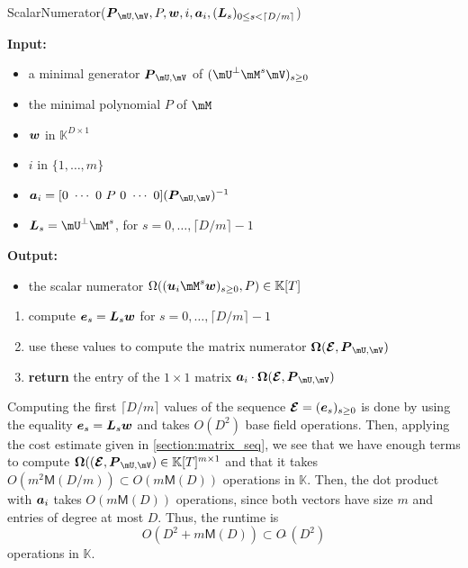 \documentclass[12pt]{article}
\newcommand{\mat}[1]{\bm{\MakeUppercase{#1}}} %
\newcommand{\row}[1]{\bm{\MakeLowercase{#1}}} %
\newcommand{\col}[1]{\bm{\MakeLowercase{#1}}} %
\newcommand{\softO}[1]{O{\tilde{~}}(#1)} %
\newcommand{\minpoly}{P}
\def\M {\ensuremath{\mathsf{M}}}
\def\K{\mathbb{K}}
\def\K {\ensuremath{\mathbb{K}}}
\begin{document}
\begin{algorithm}[H]
	\caption{{\sf ScalarNumerator}($\mat{P}_{\mU,\mV}, \minpoly, \row{w}, i, \row{a}_i,(\mat{L}_s)_{0 \le s < \lceil D/m\rceil}$)}
	{\bf Input:} \vspace{-0.5em}
	\begin{itemize}
		\item a minimal generator $\mat{P}_{\mU,\mV}$ of $(\mU^\perp \mM^s \mV)_{s \ge 0}$
    \item the minimal polynomial $P$ of $\mM$
    \item $\row{w}$ in $\K^{D \times 1}$
    \item $i$ in $\{1,\dots,m\}$
    \item $\row{a}_i =  [0~\cdots~0~\minpoly~0~\cdots~0]  (\mat{P}_{\mU,\mV})^{-1} $
		\item $\mat{L}_s = \mU^\perp \mM^s$, for $s=0,\dots,\lceil D/m\rceil-1$
	\end{itemize}
	{\bf Output:}  \vspace{-0.5em}
        \begin{itemize}
        \item         the scalar numerator $\Omega((\row{u}_i \mM^s \col{w})_{s \ge 0}, \minpoly) \in \K[T]$
        \end{itemize}
        \begin{enumerate}[{\bf 1.}]
        \item compute $\col{E}_s = \mat{L}_s \col{w}$ for $s=0,\dots,\lceil D/m\rceil-1$
        \item use these values to compute the matrix numerator $ \mat{\Omega}(\mat{\mathcal{E}}, \mat{P}_{\mU,\mV})$ 
        \item {\bf return} the entry of the $1 \times 1$ matrix $\row{a}_i\cdot  \mat{\Omega}(\mat{\mathcal{E}}, \mat{P}_{\mU,\mV})$ 
        \end{enumerate}
	\label{algo:scalar_numerator}
\end{algorithm}

Computing the first $\lceil D/m \rceil$ values of the sequence
$\mat{\mathcal{E}}=(\col{e}_s)_{s \ge 0}$ is done by using the
equality $\col{E}_s = \mat{L}_s \col{w}$ and takes $O(D^2)$ base field
operations. Then, applying the cost estimate given in
\cref{section:matrix_seq}, we see that we have enough terms to compute
$\mat{\Omega}( (\mat{\mathcal{E}}, \mat{P}_{\mU,\mV}) \in \K[T]^{m
\times 1}$ and that it takes $O(m^2 \M(D/m)) \subset O(m \M(D))$ operations in
$\K$. Then, the dot product with $\row{a}_i$ takes $O(m \M(D))$
operations, since both vectors have size $m$ and entries of degree at
most $D$. Thus, the runtime is 
$$O(D^2 + m \M(D)) \subset \softO{D^2}$$
operations in $\K$.
\end{document}
